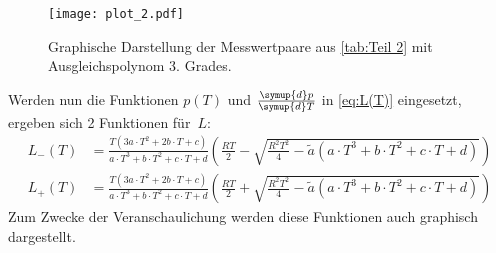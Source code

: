 \begin{figure}[H]
  \centering
  \texttt{[image: plot\_2.pdf]}
  \caption{Graphische Darstellung der Messwertpaare aus \autoref{tab:Teil 2} mit Ausgleichspolynom 3. Grades.}
  \label{fig:3.Grad Fit}
\end{figure}

Werden nun die Funktionen $p(T)$ und $\frac{\symup{d}p}{\symup{d}T}$ in \eqref{eq:L(T)} eingesetzt, ergeben sich 2 Funktionen
für~$L$:
\begin{align*}
  L_{-}(T) &= \frac{T(3a \cdot T^2 + 2b\cdot T + c)}{a \cdot T^3 + b\cdot T^2 + c \cdot T + d}\left(\frac{RT}{2} - \sqrt{\frac{R^2T^2}{4}-\tilde{a}(a \cdot T^3 + b\cdot T^2 + c \cdot T + d)}\right) \\
  L_{+}(T) &= \frac{T(3a \cdot T^2 + 2b\cdot T + c)}{a \cdot T^3 + b\cdot T^2 + c \cdot T + d}\left(\frac{RT}{2} + \sqrt{\frac{R^2T^2}{4}-\tilde{a}(a \cdot T^3 + b\cdot T^2 + c \cdot T + d)}\right)
\end{align*}
Zum Zwecke der Veranschaulichung werden diese Funktionen auch graphisch dargestellt.
